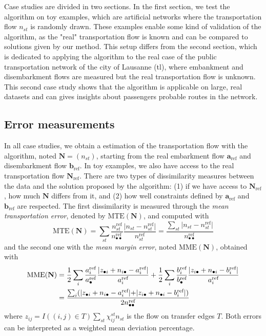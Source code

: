\documentclass{bmcart}
\begin{document}
Case studies are divided in two sections. In the first section, we test the algorithm on toy examples, which are artificial networks where the transportation flow $n_{st}$ is randomly drawn. These examples enable some kind of validation of the algorithm, as the "real" transportation flow is known and can be compared to solutions given by our method. This setup differs from the second section, which is dedicated to applying the algorithm to the real case of the public transportation network of the city of Lausanne (tl), where embankment and disembarkment flows are measured but the real transportation flow is unknown. This second case study shows that the algorithm is applicable on large, real datasets and can gives insights about passengers probable routes in the network.

\subsection{Error measurements}
\label{error_measures}

In all case studies, we obtain a estimation of the transportation flow with the algorithm, noted $\mathbf{N} = (n_{st})$, starting from the real embarkment flow $\mathbf{a}_\text{ref}$ and disembarkment flow $\mathbf{b}_\text{ref}$. In toy examples, we also have access to the real transportation flow $\mathbf{N}_\text{ref}$. 
There are two types of dissimilarity measures between the data and the solution proposed by the algorithm: (1) if we have access to $\mathbf{N}_\text{ref}$, how much $\mathbf{N}$ differs from it, and (2) how well constraints defined by $\mathbf{a}_\text{ref}$ and $\mathbf{b}_\text{ref}$ are respected. The first dissimilarity is measured through the \emph{mean transportation error}, denoted by $\text{MTE}(\mathbf{N})$, and computed with
\begin{equation}
	\text{MTE}(\mathbf{N}) = \sum_{st} \frac{n^\text{ref}_{st}}{n^\text{ref}_{\bullet \bullet}} \frac{\lvert n_{st} - n^\text{ref}_{st}\lvert}{n^\text{ref}_{st}} = \frac{\sum_{st} \lvert n_{st} - n^\text{ref}_{st}\lvert}{n^\text{ref}_{\bullet \bullet}} 
	\label{MTE}
\end{equation} 
and the second one with the \emph{mean margin error}, noted $\text{MME}(\mathbf{N})$, obtained with
\begin{align}
	\text{MME}(\mathbf{N}) &= \frac{1}{2} \sum_{i} \frac{a^\text{ref}_i}{a^\text{ref}_\bullet} \frac{\lvert z_{\bullet i} + n_{i \bullet} - a^\text{ref}_i \lvert}{a^\text{ref}_i} + \frac{1}{2} \sum_{i} \frac{b^\text{ref}_i}{b^\text{ref}_\bullet} \frac{\lvert z_{i \bullet} + n_{\bullet i} - b^\text{ref}_i \lvert}{a^\text{ref}_i} \notag \\
	&= \frac{\sum_i (\lvert z_{\bullet i} + n_{i \bullet} - a^\text{ref}_i \lvert + \lvert z_{i \bullet} + n_{\bullet i} - b^\text{ref}_i \lvert)}{2n^\text{ref}_{\bullet \bullet}}
	\label{MME}
\end{align} 
where $z_{ij} = I((i,j) \in T)\sum_{st} \chi_{ij}^{st} n_{st}$ is the flow on transfer edges $T$. Both errors can be interpreted as a weighted mean deviation percentage. 
\end{document}
